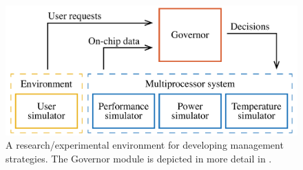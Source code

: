 \begin{figure}
  \centering
  \includegraphics[width=1.0\columnwidth]{include/assets/figures/developer.pdf}
  \caption{A research/experimental environment for developing management
  strategies. The Governor module is depicted in more detail in .}
\end{figure}

